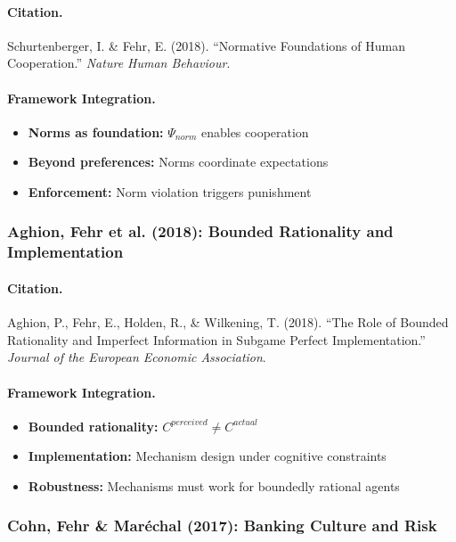 \paragraph{Citation.}
Schurtenberger, I. \& Fehr, E. (2018).
``Normative Foundations of Human Cooperation.''
\emph{Nature Human Behaviour}.

\paragraph{Framework Integration.}
\begin{itemize}
  \item \textbf{Norms as foundation:} $\Psi_{norm}$ enables cooperation
  \item \textbf{Beyond preferences:} Norms coordinate expectations
  \item \textbf{Enforcement:} Norm violation triggers punishment
\end{itemize}

\subsubsection{Aghion, Fehr et al. (2018): Bounded Rationality and Implementation}

\paragraph{Citation.}
Aghion, P., Fehr, E., Holden, R., \& Wilkening, T. (2018).
``The Role of Bounded Rationality and Imperfect Information in Subgame Perfect Implementation.''
\emph{Journal of the European Economic Association}.

\paragraph{Framework Integration.}
\begin{itemize}
  \item \textbf{Bounded rationality:} $C^{perceived} \neq C^{actual}$
  \item \textbf{Implementation:} Mechanism design under cognitive constraints
  \item \textbf{Robustness:} Mechanisms must work for boundedly rational agents
\end{itemize}

\subsubsection{Cohn, Fehr \& Mar\'echal (2017): Banking Culture and Risk}

